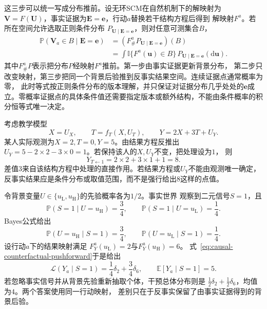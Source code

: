 这三步可以统一写成分布推前。设无环SCM在自然机制下的解映射为
\(\bm{V}=F(\bm{U})\)，事实证据为\(\bm{E}=\bm{e}\)，行动\(a\)替换若干结构方程后得到
解映射\(F^a\)。若所在空间允许选取正则条件分布
\(P_{\bm{U}\mid\bm{E}=\bm{e}}\)，则对任意可测集合\(B\)，
\begin{equation}
  \begin{aligned}
  \mathbb{P}(\bm{V}_a\in B\mid\bm{E}=\bm{e})
  &=
  \left(F^a_{\#}
    P_{\bm{U}\mid\bm{E}=\bm{e}}\right)(B)\\
  &=
  \int
  \mathbb{I}\{F^a(\bm{u})\in B\}\,
  P_{\bm{U}\mid\bm{E}=\bm{e}}(\mathrm d\bm{u}).
  \end{aligned}
  \label{eq:causal-counterfactual-pushforward}
\end{equation}
其中\(F^a_{\#}P\)表示把分布\(P\)经映射\(F^a\)推前。第一步由事实证据更新背景分布，
第二步只改变映射，第三步把同一个背景后验推到反事实结果空间。连续证据点通常概率为零，
此时等式按正则条件分布的版本理解，并只保证对证据分布几乎处处的\(\bm{e}\)成立。零概率证据点的具体条件值还需要指定版本或额外结构，不能由条件概率的积分恒等式唯一决定。

考虑教学模型
\begin{equation}
  X=U_X,\qquad
  T=f_T(X,U_T),\qquad
  Y=2X+3T+U_Y.
  \label{eq:causal-counterfactual-linear-example}
\end{equation}
某人实际观测为\(X=2,T=0,Y=5\)。由结果方程反推出
\(U_Y=5-2\times2-3\times0=1\)。若保持该人的\(X,U_Y\)不变，把处理设为\(1\)，
则
\[
  Y_{T\leftarrow1}=2\times2+3\times1+1=8.
\]
差值\(3\)来自该结构方程中处理的直接作用。若结果方程或\(U_Y\)不能由观测唯一确定，
反事实结果应是条件分布或取值范围，而不是强行给出\(8\)这样的点值。

\begin{example}[两点背景后验的反事实推前]
  \label{ex:causal-two-point-background-posterior}
  令背景变量\(U\in\{u_{\mathrm L},u_{\mathrm H}\}\)的先验概率各为\(1/2\)。事实世界
  观察到二元信号\(S=1\)，且
  \[
    \mathbb{P}(S=1\mid U=u_{\mathrm H})=\frac34,\qquad
    \mathbb{P}(S=1\mid U=u_{\mathrm L})=\frac14.
  \]
  Bayes公式给出
  \[
    \mathbb{P}(U=u_{\mathrm H}\mid S=1)=\frac34,\qquad
    \mathbb{P}(U=u_{\mathrm L}\mid S=1)=\frac14.
  \]
  设行动\(a\)下的结果映射满足
  \(F_Y^a(u_{\mathrm L})=2\)与\(F_Y^a(u_{\mathrm H})=6\)。
  式~\eqref{eq:causal-counterfactual-pushforward}于是给出
  \[
    \mathcal L(Y_a\mid S=1)
    =\frac14\delta_2+\frac34\delta_6,
    \qquad
    \mathbb{E}[Y_a\mid S=1]=5.
  \]
  若忽略事实信号并从背景先验重新抽取个体，干预总体分布则是
  \(\frac12\delta_2+\frac12\delta_6\)，均值为\(4\)。两个答案使用同一行动映射，
  差别只在于反事实保留了由事实证据得到的背景后验。
\end{example}

